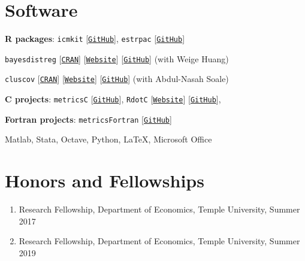 \documentclass[12pt,letterpaper]{article}
\renewenvironment{itemize}{
  \begin{list}{}{
    \setlength{\leftmargin}{1.5em}
  }
}{
  \end{list}
}
\begin{document}
\section*{Software}
\begin{itemize}
  \item \textbf{R packages}: \texttt{icmkit} [\texttt{\href{https://github.com/estsyawo/icmkit}{GitHub}}], \texttt{estrpac} [\texttt{\href{https://github.com/estsyawo/estrpac}{GitHub}}]
  \item \hspace*{1.4em}\texttt{bayesdistreg} [\texttt{\href{https://CRAN.R-project.org/package=bayesdistreg}{CRAN}}] [\texttt{\href{https://estsyawo.github.io/bayesdistreg/}{Website}}] [\texttt{\href{https://github.com/estsyawo/bayesdistreg}{GitHub}}] (with Weige Huang)
  \item \hspace*{1.4em}\texttt{cluscov} [\texttt{\href{https://CRAN.R-project.org/package=cluscov}{CRAN}}] [\texttt{\href{https://estsyawo.github.io/cluscov/}{Website}}] [\texttt{\href{https://github.com/estsyawo/cluscov}{GitHub}}] (with Abdul-Nasah Soale)

  \item \textbf{C projects}: \texttt{metricsC} [\texttt{\href{https://github.com/estsyawo/metricsC}{GitHub}}], \texttt{RdotC} [\texttt{\href{https://estsyawo.github.io/RdotC/index.html}{Website}}] [\texttt{\href{https://github.com/estsyawo/RdotC}{GitHub}}], 
  
  \item \textbf{Fortran projects}: \texttt{metricsFortran} [\texttt{\href{https://github.com/estsyawo/metricsFortran}{GitHub}}]
  \item Matlab,  Stata, Octave, Python, \LaTeX, Microsoft Office
\end{itemize}


\section*{Honors and Fellowships}
\begin{enumerate}
  \item Research Fellowship, Department of Economics, Temple University, Summer 2017
  \item Research Fellowship, Department of Economics, Temple University, Summer 2019
\end{enumerate}
\end{document}
